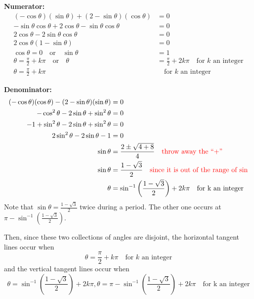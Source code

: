 \documentclass[]{ximera}
\begin{document}
\begin{problem}
\begin{freeResponse}
	{\bf Numerator:}
		\begin{align*}
		(- \cos \theta)(\sin \theta) + (2 - \sin \theta)(\cos \theta) &= 0  \\
		- \sin \theta \cos \theta + 2 \cos \theta - \sin \theta \cos \theta &= 0  \\
		2 \cos \theta - 2 \sin \theta \cos \theta &= 0  \\
		2 \cos \theta (1 - \sin \theta) &= 0  \\
		\cos \theta = 0 \quad \text{or} \quad \sin \theta &= 1  \\
		\theta = \frac{\pi}{2} + k \pi  \quad  \text{or}  \quad  \theta &= \frac{\pi}{2} + 2k\pi \quad \text{for } k \text{ an integer}  \\
		\theta = \frac{\pi}{2} + k \pi  &\quad \text{for } k \text{ an integer}
		\end{align*}
		
	{\bf Denominator:}
		\begin{align*}
		(-\cos \theta)(\cos \theta) - (2 - \sin \theta)(\sin \theta) &= 0  \\
		- \cos^2 \theta - 2 \sin \theta + \sin^2 \theta &= 0  \\
		-1 + \sin^2 \theta - 2 \sin \theta + \sin^2 \theta &= 0  \\
		2 \sin^2 \theta - 2 \sin \theta - 1 &= 0  \\
		\sin \theta &= \frac{2 \pm \sqrt{4 + 8}}{4}  	\quad  {\color{red}\text{throw away the ``+'' }}\\
		\sin \theta &= \frac{1 - \sqrt{3}}{2}  \quad {\color{red}\text{since it is out of the range of sin}}\\
		\theta &= \sin^{-1} \left( \frac{1-\sqrt{3}}{2} \right) + 2 k \pi 	\quad \text{for k an integer}
		\end{align*}
	Note that $\sin \theta = \frac{1-\sqrt{3}}{2}$ twice during a period. The other one occurs at $\pi - \sin^{-1}\left(\frac{1-\sqrt{3}}{2}\right)$. 
		
	Then, since these two collections of angles are disjoint, the horizontal tangent lines occur when
		\[
		\boxed{\theta = \frac{\pi}{2} + k \pi}  \quad \text{for } k \text{ an integer}
		\]
	and the vertical tangent lines occur when
		\[
		\boxed{\theta = \sin^{-1} \left( \frac{1-\sqrt{3}}{2} \right) + 2 k \pi, \theta = \pi - \sin^{-1}\left(\frac{1-\sqrt{3}}{2}\right)+2k \pi} 	\quad \text{for k an integer}
		\]
	\end{freeResponse}
	
\end{problem}
\end{document}
